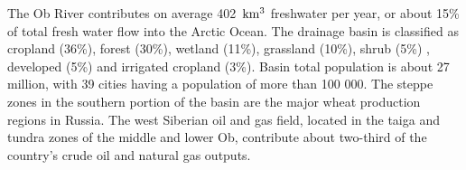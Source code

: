 The Ob River contributes on average 402 $\,\mathrm{km^3}$ freshwater per year, or about 15\% of total fresh water flow into the Arctic Ocean. The drainage basin is classified as cropland (36\%), forest (30\%), wetland (11\%), grassland (10\%), shrub (5\%) , developed (5\%) and irrigated cropland (3\%). Basin total population is about 27 million, with 39 cities having a population of more than 100 000. The steppe zones in the southern portion of the basin are the major wheat production regions in Russia. The west Siberian oil and gas field, located in the taiga and tundra zones of the middle and lower Ob, contribute about two-third of the country's crude oil and natural gas outputs.  